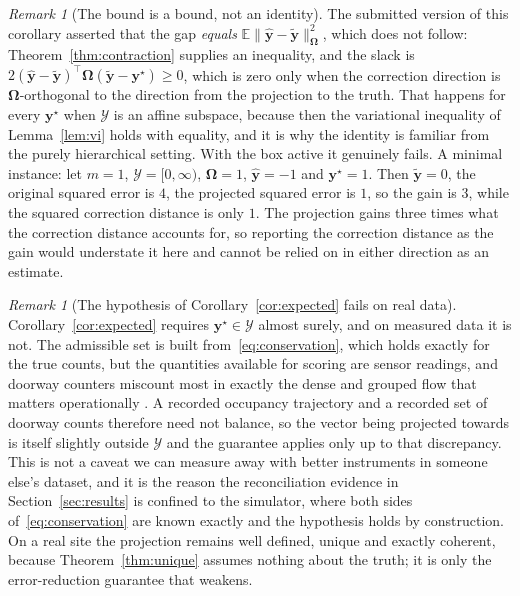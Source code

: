 \documentclass[11pt]{article}
\theoremstyle{plain}
\theoremstyle{definition}
\theoremstyle{remark}
\newtheorem{remark}[theorem]{Remark}
\newcommand{\by}{\bm{y}}
\newcommand{\bOm}{\bm{\Omega}}
\newcommand{\yhat}{\hat{\by}}
\newcommand{\ytil}{\tilde{\by}}
\newcommand{\cY}{\mathcal{Y}}
\newif\ifrevisionmarkup
\newcommand{\new}[1]{\ifrevisionmarkup\textcolor{revision}{#1}\else#1\fi}
\begin{document}
\begin{remark}[The bound is a bound, not an identity]
\label{rem:notequality}
\new{The submitted version of this corollary asserted that the gap \emph{equals} $\mathbb{E}\|\yhat-\ytil\|_{\bOm}^{2}$, which does not follow: Theorem~\ref{thm:contraction} supplies an inequality, and the slack is $2(\yhat-\ytil)^{\top}\bOm(\ytil-\by^{\star}) \ge 0$, which is zero only when the correction direction is $\bOm$-orthogonal to the direction from the projection to the truth. That happens for every $\by^{\star}$ when $\cY$ is an affine subspace, because then the variational inequality of Lemma~\ref{lem:vi} holds with equality, and it is why the identity is familiar from the purely hierarchical setting. With the box active it genuinely fails. A minimal instance: let $m=1$, $\cY = [0,\infty)$, $\bOm = 1$, $\yhat = -1$ and $\by^{\star} = 1$. Then $\ytil = 0$, the original squared error is $4$, the projected squared error is $1$, so the gain is $3$, while the squared correction distance is only $1$. The projection gains three times what the correction distance accounts for, so reporting the correction distance as the gain would understate it here and cannot be relied on in either direction as an estimate.}
\end{remark}

\begin{remark}[The hypothesis of Corollary~\ref{cor:expected} fails on real data]
\label{rem:admissible}
Corollary~\ref{cor:expected} requires $\by^{\star} \in \cY$ almost surely, and on measured data it is not. The admissible set is built from~\eqref{eq:conservation}, which holds exactly for the true counts, but the quantities available for scoring are sensor readings, and doorway counters miscount most in exactly the dense and grouped flow that matters operationally \citep{brscic2013}. A recorded occupancy trajectory and a recorded set of doorway counts therefore need not balance, so the vector being projected towards is itself slightly outside $\cY$ and the guarantee applies only up to that discrepancy. This is not a caveat we can measure away with better instruments in someone else's dataset, and it is the reason the reconciliation evidence in Section~\ref{sec:results} is confined to the simulator, where both sides of~\eqref{eq:conservation} are known exactly and the hypothesis holds by construction. On a real site the projection remains well defined, unique and exactly coherent, because Theorem~\ref{thm:unique} assumes nothing about the truth; it is only the error-reduction guarantee that weakens.
\end{remark}
\end{document}
